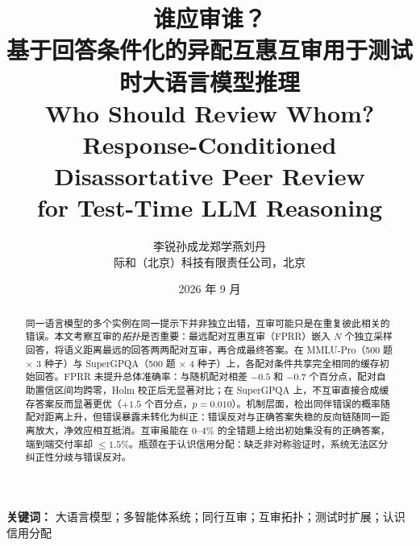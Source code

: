 \documentclass[UTF8,11pt]{ctexart}
\title{谁应审谁？\\基于回答条件化的异配互惠互审用于测试时大语言模型推理\\[0.5em]
{\large Who Should Review Whom? Response-Conditioned Disassortative Peer Review\\for Test-Time LLM Reasoning}}
\author{李锐\quad 孙成龙\quad 郑学燕\quad 刘丹\\[0.3em]际和（北京）科技有限责任公司，北京}
\date{2026 年 9 月}
\begin{document}
\maketitle

\begin{abstract}
同一语言模型的多个实例在同一提示下并非独立出错，互审可能只是在重复彼此相关的错误。本文考察互审的\emph{拓扑}是否重要：最远配对互惠互审（FPRR）嵌入 $N$ 个独立采样回答，将语义距离最远的回答两两配对互审，再合成最终答案。在 MMLU-Pro（500 题 $\times$ 3 种子）与 SuperGPQA（500 题 $\times$ 4 种子）上，各配对条件共享完全相同的缓存初始回答。FPRR 未提升总体准确率：与随机配对相差 $-0.5$ 和 $-0.7$ 个百分点，配对自助置信区间均跨零，Holm 校正后无显著对比；在 SuperGPQA 上，不互审直接合成缓存答案反而显著更优（$+1.5$ 个百分点，$p=0.010$）。机制层面，检出同伴错误的概率随配对距离上升，但错误暴露未转化为纠正：错误反对与正确答案失稳的反向链随同一距离放大，净效应相互抵消。互审虽能在 $0$--$4\%$ 的全错题上给出初始集没有的正确答案，端到端交付率却 $\le 1.5\%$。瓶颈在于认识信用分配：缺乏非对称验证时，系统无法区分纠正性分歧与错误反对。
\end{abstract}

\noindent\textbf{关键词：} 大语言模型；多智能体系统；同行互审；互审拓扑；测试时扩展；认识信用分配

\bigskip
\end{document}
